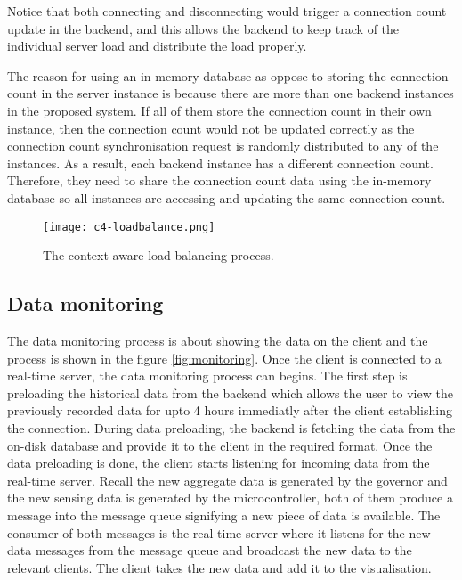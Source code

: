 \documentclass[../thesis.tex]{subfiles}
\begin{document}
Notice that both connecting and disconnecting would trigger a connection count update in the backend, and this allows the backend to keep track of the individual server load and distribute the load properly. 

The reason for using an in-memory database as oppose to storing the connection count in the server instance is because there are more than one backend instances in the proposed system. If all of them store the connection count in their own instance, then the connection count would not be updated correctly as the connection count synchronisation request is randomly distributed to any of the instances. As a result, each backend instance has a different connection count. Therefore, they need to share the connection count data using the in-memory database so all instances are accessing and updating the same connection count.  

\begin{figure}[!ht]
	\centering
	\texttt{[image: c4-loadbalance.png]}
	\caption{The context-aware load balancing process.}
	\label{fig:loadbalancing}
\end{figure}

\subsection{Data monitoring}

The data monitoring process is about showing the data on the client and the process is shown in the figure \ref{fig:monitoring}. Once the client is connected to a real-time server, the data monitoring process can begins. The first step is preloading the historical data from the backend which allows the user to view the previously recorded data for upto 4 hours immediatly after the client establishing the connection. During data preloading, the backend is fetching the data from the on-disk database and provide it to the client in the required format. Once the data preloading is done, the client starts listening for incoming data from the real-time server. Recall the new aggregate data is generated by the governor and the new sensing data is generated by the microcontroller, both of them produce a message into the message queue signifying a new piece of data is available. The consumer of both messages is the real-time server where it listens for the new data messages from the message queue and broadcast the new data to the relevant clients. The client takes the new data and add it to the visualisation. 
\end{document}

